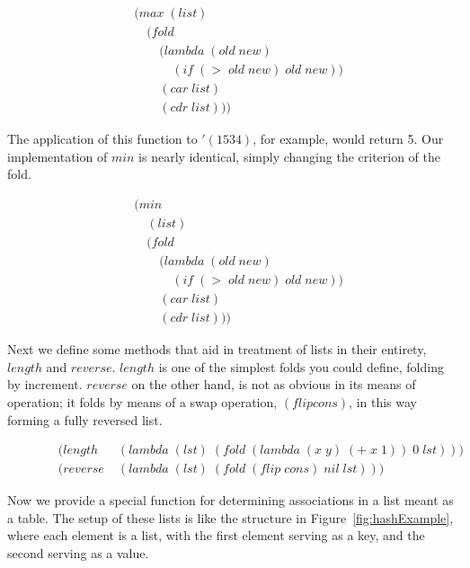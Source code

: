 \begin{figure}[htp]
\footnotesize
\caption{}\label{fig:maxDef}
\begin{align*}
& (max \; (list)
\\& \quad (fold \; 
\\& \qquad (lambda \; (old \; new)
\\& \qquad \quad (if \; (> \; old \; new) \; old \; new))
\\& \qquad (car \; list)
\\& \qquad (cdr \; list)))
\end{align*}
\end{figure}

The application of this function to $'(1 5 3 4)$, for example, would return 5. Our 
implementation of $min$ is nearly identical, simply changing the criterion of the 
fold.

\begin{figure}[htp]
\footnotesize
\caption{}\label{fig:minDef}
\begin{align*}
& (min \; 
\\& \quad (list)
\\& \quad (fold \; 
\\& \qquad (lambda \; (old \; new)
\\& \qquad \quad (if \; (> \; old \; new) \; old \; new))
\\& \qquad (car \; list)
\\& \qquad (cdr \; list)))
\end{align*}
\end{figure}

Next we define some methods that aid in treatment of lists in their entirety, 
$length$ and $reverse$. $length$ is one of the simplest folds you could define, 
folding by increment. $reverse$ on the other hand, is not as obvious in its means 
of operation; it folds by means of a swap operation, $(flip cons)$, in this way 
forming a fully reversed list.

\begin{figure}[htp]
\footnotesize
\caption{}\label{fig:lengthAndRevDefs}
\begin{align*}
& (length \; &(lambda \; (lst) \; (fold \; (lambda \; (x \; y) \; (+ \; x \; 1)) \; 0 \; lst)))
\\& (reverse \; &(lambda \; (lst) \; (fold \; (flip \; cons) \; nil \; lst)))
\end{align*}
\end{figure}

Now we provide a special function for determining associations in a list meant
as a table. The setup of these lists is like the structure in
Figure~\ref{fig:hashExample}, where each element is a list, with the first
element serving as a key, and the second serving as a value.

